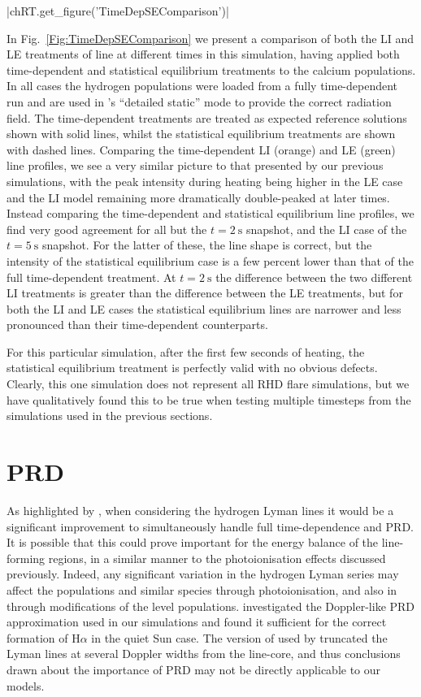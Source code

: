\py[TimeDepRT]|chRT.get_figure('TimeDepSEComparison')|

In Fig.~\ref{Fig:TimeDepSEComparison} we present a comparison of both the LI and LE treatments of \CaLine{} line at different times in this simulation, having applied both time-dependent and statistical equilibrium treatments to the calcium populations.
In all cases the hydrogen populations were loaded from a fully time-dependent run and are used in \Lw{}'s ``detailed static'' mode to provide the correct radiation field.
The time-dependent treatments are treated as expected reference solutions shown with solid lines, whilst the statistical equilibrium treatments are shown with dashed lines.
Comparing the time-dependent LI (orange) and LE (green) line profiles, we see a very similar picture to that presented by our previous simulations, with the peak intensity during heating being higher in the LE case and the LI model remaining more dramatically double-peaked at later times.
Instead comparing the time-dependent and statistical equilibrium line profiles, we find very good agreement for all but the $t=\SI{2}{\second}$ snapshot, and the LI case of the $t=\SI{5}{\second}$ snapshot.
For the latter of these, the line shape is correct, but the intensity of the statistical equilibrium case is a few percent lower than that of the full time-dependent treatment.
At $t=\SI{2}{\second}$ the difference between the two different LI treatments is greater than the difference between the LE treatments, but for both the LI and LE cases the statistical equilibrium lines are narrower and less pronounced than their time-dependent counterparts.

For this particular simulation, after the first few seconds of heating, the statistical equilibrium treatment is perfectly valid with no obvious defects.
Clearly, this one simulation does not represent all RHD flare simulations, but we have qualitatively found this to be true when testing multiple timesteps from the simulations used in the previous sections.


\section{PRD}\label{Sec:TimeDepPrd}

As highlighted by \citet{Brown2018}, when considering the hydrogen Lyman lines it would be a significant improvement to simultaneously handle full time-dependence and PRD.
It is possible that this could prove important for the energy balance of the line-forming regions, in a similar manner to the photoionisation effects discussed previously.
Indeed, any significant variation in the hydrogen Lyman series may affect the populations \Caii{} and similar species through photoionisation, and also in \Ha{} through modifications of the level populations.
\citet{Leenaarts2012a} investigated the Doppler-like PRD approximation used in our \Radyn{} simulations and found it sufficient for the correct formation of H$\alpha$ in the quiet Sun case.
The version of \Radyn{} used by \citet{Brown2018} truncated the Lyman lines at several Doppler widths from the line-core, and thus conclusions drawn about the importance of PRD may not be directly applicable to our models.

